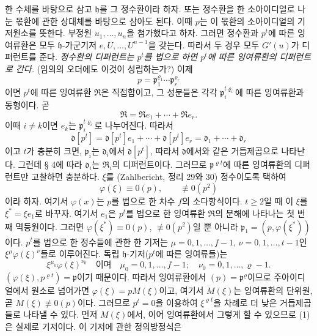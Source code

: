 한 수체를 바탕으로 삼고 \(\mathfrak h\)를 그 정수환이라 하자. 또는 정수환을 한 소아이디얼로 나눈 몫환에 관한 상대체를 바탕으로 삼아도 된다. 이때 \(p\)는 이 몫환의 소아이디얼의 기저원소를 뜻한다. 부정원 \(u_1,\ldots,u_n\)을 첨가했다고 하자. 그러면 정수환과 \(p^t\)에 따른 잉여류환은 모두 \(\mathfrak h\)-가군기저 \(e,U,\ldots,U^{n-1}\)을 갖는다. 따라서 두 경우 모두 \(G'(u)\)가 디퍼런트를 준다. \emph{정수환의 디퍼런트는 \(p^t\)를 법으로 하면 \(p^t\)에 따른 잉여류환의 디퍼런트로 간다.} (임의의 오더에도 이것이 성립하는가?) 이제
\[
p=\mathfrak p_1^{\varrho_1}\cdots\mathfrak p_r^{\varrho_r}
\]
이면 \(p^t\)에 따른 잉여류환 \(\mathfrak R\)은 직접합이고, 그 성분들은 각각 \(\mathfrak p_i^{t\varrho_i}\)에 따른 잉여류환과 동형이다. 곧
\[
\mathfrak R=\mathfrak R e_1+\cdots+\mathfrak R e_r.
\]
이때 \(i\ne k\)이면 \(e_k\)는 \(\mathfrak p_i^{t\varrho_i}\)로 나누어진다. 따라서
\[
\mathfrak d[p^t]=\mathfrak d[p^t]e_1+\cdots+\mathfrak d[p^t]e_r
=\mathfrak d_1+\cdots+\mathfrak d_r
\]
이고 \(t\)가 충분히 크면, \(\mathfrak p_i\)는 \(\mathfrak d_i\)에서 \(\mathfrak d[p^t]\), 따라서 \(\mathfrak d\)에서와 같은 거듭제곱으로 나타난다. 그런데 § 4에 따라 \(\mathfrak d_i\)는 \(\mathfrak R_i\)의 디퍼런트이다. 그러므로 \(\mathfrak p^{\varrho t}\)에 따른 잉여류환의 디퍼런트만 고찰하면 충분하다. \(\xi\)를 (Zahlbericht, 정리 29와 30) 정수이도록 택하여
\[
\varphi(\xi)\equiv0(p),
\qquad \not\equiv0(p^2)
\]
이라 하자. 여기서 \(\varphi(x)\)는 \(p\)를 법으로 한 차수 \(f\)의 소다항식이다. \(t\ge2\)일 때 이 \(\xi\)를 \(\xi^*=\xi e_1\)로 바꾸자. 여기서 \(e_1\)은 \(p^t\)를 법으로 한 잉여류환 \(\mathfrak R\)의 분해에 나타나는 첫 번째 멱등원이다. 그러면 \(\varphi(\xi^*)\equiv0(p)\), \(\not\equiv0(p^2)\)일 뿐 아니라 \(\mathfrak p_1=(p,\varphi(\xi^*))\)이다. \(p^t\)를 법으로 한 정수들에 관한 한 기저는 \(\mu=0,1,\ldots,f-1\), \(\nu=0,1,\ldots,t-1\)인 \(\xi^\mu\varphi(\xi)^\nu\)들로 이루어진다. 독립 \(\mathfrak h\)-기저(\(p^t\)에 따른 잉여류들)는
\begin{equation}
\xi^{\mu_0}\varphi(\xi)^{\nu_0}
\quad\text{이며}\quad
\mu_0=0,1,\ldots,f-1;
\quad \nu_0=0,1,\ldots,\varrho-1. \tag{1}
\end{equation}
\((\varphi(\xi),p^{\varrho t})=\mathfrak p\)이기 때문이다. 따라서 잉여류환에서 \((p)=\mathfrak p^\varrho\)이므로 주아이디얼에서 원소로 넘어가면 \(\varphi(\xi)=pM(\xi)\)이고, 여기서 \(M(\xi)\)는 잉여류환의 단위원, 곧 \(M(\xi)\not\equiv0(p)\)이다. 그러므로 \(p^t=0\)을 이용하여 \(\xi^{\varrho t}\)을 차례로 더 낮은 거듭제곱들로 나타낼 수 있다. 먼저 \(M(\xi)\)에서, 이어 잉여류환에서 그렇게 할 수 있으므로 (1)은 실제로 기저이다. 이 기저에 관한 정의방정식은
